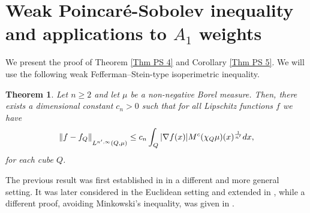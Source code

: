\documentclass[reqno, 10pt, oneside]{amsart}
\numberwithin{equation}{section}
\newcommand{\strt}[1]{\rule{0pt}{#1}}
\newtheorem{theorem}{Theorem}
\numberwithin{theorem}{section}
\newcommand{\1}{{\rm 1\hspace*{-0.4ex}%
\rule{0.1ex}{1.52ex}\hspace*{0.2ex}}}
\begin{document}
\section{Weak Poincaré-Sobolev inequality and applications to \texorpdfstring{$A_1$}{A1} weights}\label{Section Weak}

We present the proof of Theorem \ref{Thm PS 4} and Corollary \ref{Thm PS 5}. We will use the following weak Fefferman--Stein-type isoperimetric inequality. 


\begin{theorem}\label{Thm FPW}
    Let $n\ge 2$ and let $\mu$ be a non-negative Borel measure. Then, there exists a dimensional constant $c_n>0$ such that for all Lipschitz functions $f$ we have
        \begin{equation}\label{Thm FPW Eq}
            \left\| f-f_Q\right\|_{\strt{2.3ex} L^{n',\infty}(Q,\mu)}
            \le c_n \int_Q |\nabla f(x)| M^c(\chi_Q\mu)(x)^\frac{1}{n'} dx,
        \end{equation}
    for each cube $Q$.
\end{theorem}

The previous result was first established in \cite{FPW} in a different and more general setting. It was later considered in the Euclidean setting and extended in \cite{PR}, while a different proof, avoiding Minkowski's inequality, was given in \cite{PR2}. 
\end{document}
